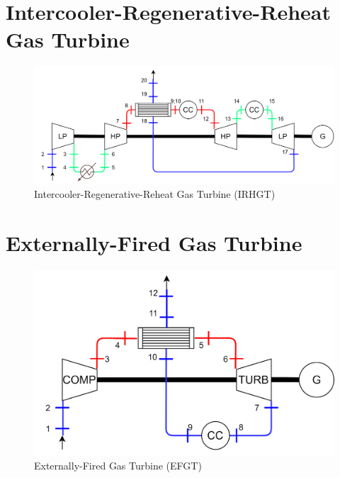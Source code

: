 \section{Intercooler-Regenerative-Reheat Gas Turbine}
\begin{figure}[H]
    \centering
    \includegraphics[scale=0.15]{Chapitre_5/Images/IRHGT.png}
    \caption{Intercooler-Regenerative-Reheat Gas Turbine (IRHGT)}
    \label{fig:ann_IRHGT}
\end{figure}

\section{Externally-Fired Gas Turbine}
\begin{figure}[H]
    \centering
    \includegraphics[scale=0.15]{Chapitre_5/Images/EFGT.png}
    \caption{Externally-Fired Gas Turbine (EFGT)}
    \label{fig:ann_EFGT}
\end{figure}